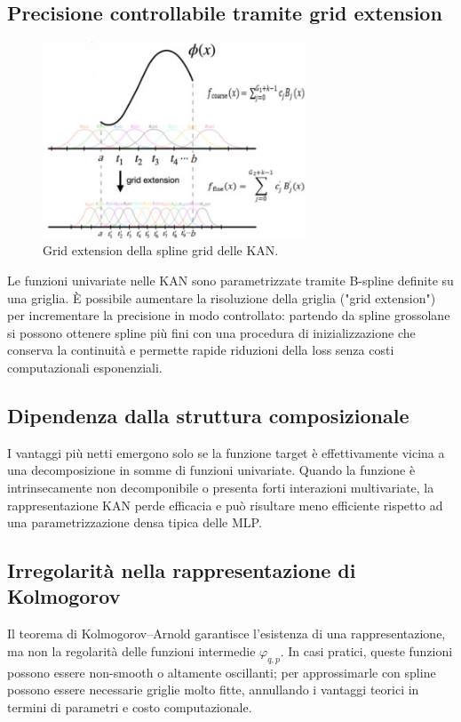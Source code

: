 \documentclass[a4paper,12pt]{report}
\begin{document}
	\subsection{Precisione controllabile tramite grid extension}
	\begin{figure}[H]
		\centering
		\includegraphics[width=0.7\textwidth]{img/grid_extension.jpg}
		\caption{Grid extension della spline grid delle KAN.}
	\end{figure}
	Le funzioni univariate nelle KAN sono parametrizzate tramite B-spline definite su una griglia. È possibile aumentare la risoluzione della griglia ("grid extension") per incrementare la precisione in modo controllato: partendo da spline grossolane si possono ottenere spline più fini con una procedura di inizializzazione che conserva la continuità e permette rapide riduzioni della loss senza costi computazionali esponenziali.
	
	\subsection{Dipendenza dalla struttura composizionale}
	I vantaggi più netti emergono solo se la funzione target è effettivamente vicina a una decomposizione in somme di funzioni univariate. Quando la funzione è intrinsecamente non decomponibile o presenta forti interazioni multivariate, la rappresentazione KAN perde efficacia e può risultare meno efficiente rispetto ad una parametrizzazione densa tipica delle MLP.
	
	\subsection{Irregolarità nella rappresentazione di Kolmogorov}
	Il teorema di Kolmogorov–Arnold garantisce l'esistenza di una rappresentazione, ma non la regolarità delle funzioni intermedie \(\varphi_{q,p}\). In casi pratici, queste funzioni possono essere non-smooth o altamente oscillanti; per approssimarle con spline possono essere necessarie griglie molto fitte, annullando i vantaggi teorici in termini di parametri e costo computazionale.
	
\end{document}
